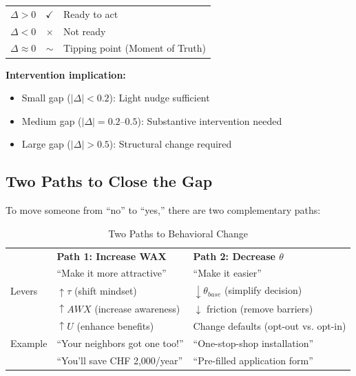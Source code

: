 \begin{intuition}
\begin{center}
\begin{tabular}{rcp{6cm}}
$\Delta > 0$ & $\checkmark$ & Ready to act\\
$\Delta < 0$ & $\times$ & Not ready\\
$\Delta \approx 0$ & $\sim$ & Tipping point (Moment of Truth)\\
\end{tabular}
\end{center}

\textbf{Intervention implication:}
\begin{itemize}[nosep]
\item Small gap ($|\Delta| < 0.2$): Light nudge sufficient
\item Medium gap ($|\Delta| = 0.2$--$0.5$): Substantive intervention needed
\item Large gap ($|\Delta| > 0.5$): Structural change required
\end{itemize}
\end{intuition}

\subsection{Two Paths to Close the Gap}

To move someone from ``no'' to ``yes,'' there are two complementary paths:

\begin{table}[h]
\centering
\caption{Two Paths to Behavioral Change}
\label{tab:two-paths}
\begin{tabular}{lp{5cm}p{5cm}}
\toprule
& \textbf{Path 1: Increase WAX} & \textbf{Path 2: Decrease $\theta$}\\
& ``Make it more attractive'' & ``Make it easier''\\
\midrule
Levers & $\uparrow \tau$ (shift mindset) & $\downarrow \theta_{base}$ (simplify decision)\\
& $\uparrow AWX$ (increase awareness) & $\downarrow$ friction (remove barriers)\\
& $\uparrow U$ (enhance benefits) & Change defaults (opt-out vs. opt-in)\\
\midrule
Example & ``Your neighbors got one too!'' & ``One-stop-shop installation''\\
& ``You'll save CHF 2,000/year'' & ``Pre-filled application form''\\
\bottomrule
\end{tabular}
\end{table}

